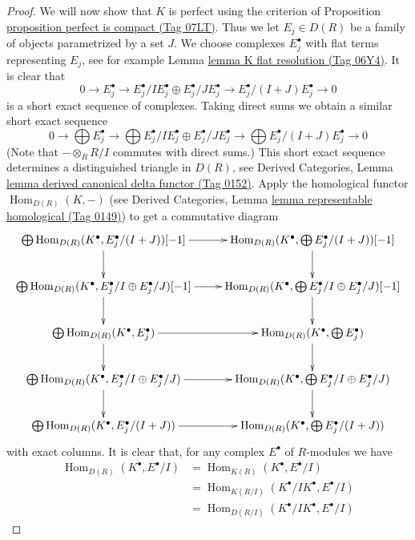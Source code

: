\documentclass{amsart}
\theoremstyle{plain}
\theoremstyle{definition}
\theoremstyle{remark}
\numberwithin{equation}{subsection}
\def\Hom{\mathop{\mathrm{Hom}}\nolimits}
\begin{document}
\begin{proof}
\medskip\noindent
We will now show that $K$ is perfect using the criterion of
Proposition \href{https://stacks.math.columbia.edu/tag/07LT}{proposition perfect is compact (Tag 07LT)}. Thus we let
$E_j \in D(R)$ be a family of objects parametrized by a set $J$.
We choose complexes $E_j^\bullet$ with flat terms
representing $E_j$, see for example Lemma \href{https://stacks.math.columbia.edu/tag/06Y4}{lemma K flat resolution (Tag 06Y4)}.
It is clear that
$$
0 \to
E_j^\bullet \to
E_j^\bullet/IE_j^\bullet \oplus E_j^\bullet/JE_j^\bullet \to
E_j^\bullet/(I + J)E_j^\bullet \to 0
$$
is a short exact sequence of complexes. Taking direct sums we obtain a
similar short exact sequence
$$
0 \to
\bigoplus E_j^\bullet \to
\bigoplus E_j^\bullet/IE_j^\bullet \oplus E_j^\bullet/JE_j^\bullet \to
\bigoplus E_j^\bullet/(I + J)E_j^\bullet \to 0
$$
(Note that $- \otimes_R R/I$ commutes with direct sums.)
This short exact sequence determines a distinguished triangle in $D(R)$, see
Derived Categories, Lemma \href{https://stacks.math.columbia.edu/tag/0152}{lemma derived canonical delta functor (Tag 0152)}.
Apply the homological functor $\Hom_{D(R)}(K, -)$ (see
Derived Categories, Lemma \href{https://stacks.math.columbia.edu/tag/0149}{lemma representable homological (Tag 0149)})
to get a commutative diagram
$$
\xymatrix{
\bigoplus \Hom_{D(R)}(K^\bullet, E_j^\bullet/(I + J))[-1] \ar[r] \ar[d] &
\Hom_{D(R)}(K^\bullet, \bigoplus E_j^\bullet/(I + J))[-1] \ar[d] \\
\bigoplus \Hom_{D(R)}(K^\bullet, E_j^\bullet/I \oplus E_j^\bullet/J)[-1]
\ar[r] \ar[d] &
\Hom_{D(R)}(K^\bullet, \bigoplus E_j^\bullet/I \oplus E_j^\bullet/J)[-1]
\ar[d] \\
\bigoplus \Hom_{D(R)}(K^\bullet, E_j^\bullet) \ar[r] \ar[d] &
\Hom_{D(R)}(K^\bullet, \bigoplus E_j^\bullet) \ar[d] \\
\bigoplus \Hom_{D(R)}(K^\bullet, E_j^\bullet/I \oplus E_j^\bullet/J)
\ar[r] \ar[d] &
\Hom_{D(R)}(K^\bullet, \bigoplus E_j^\bullet/I \oplus E_j^\bullet/J)
\ar[d] \\
\bigoplus \Hom_{D(R)}(K^\bullet, E_j^\bullet/(I + J)) \ar[r] &
\Hom_{D(R)}(K^\bullet, \bigoplus E_j^\bullet/(I + J))
}
$$
with exact columns. It is clear that, for any complex $E^\bullet$
of $R$-modules we have
\begin{align*}
\Hom_{D(R)}(K^\bullet, E^\bullet/I) & =
\Hom_{K(R)}(K^\bullet, E^\bullet/I) \\
& =
\Hom_{K(R/I)}(K^\bullet/IK^\bullet, E^\bullet/I) \\
& =
\Hom_{D(R/I)}(K^\bullet/IK^\bullet, E^\bullet/I)

\end{align*}
\end{proof}
\end{document}
